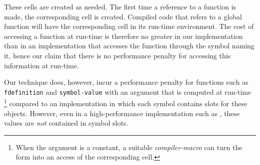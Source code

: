These cells are created as needed.  The first time a reference to a
function is made, the corresponding cell is created.  Compiled code
that refers to a global function will have the corresponding cell in
its run-time environment.  The cost of accessing a function at
run-time is therefore no greater in our implementation than in an
implementation that accesses the function through the symbol naming
it, hence our claim that there is no performance penalty for accessing
this information at run-time.

Our technique does, however, incur a performance penalty for functions
such as \texttt{fdefinition} and \texttt{symbol-value} with an
argument that is computed at run-time%
\footnote{When the argument is a constant, a suitable
  \emph{compiler-macro} can turn the form into an access of the
  corresponding cell.}
compared to an implementation in which each symbol contains slots for
these objects.  However, even in a high-performance implementation such
as \sbcl{}, these values are \emph{not} contained in symbol slots.
